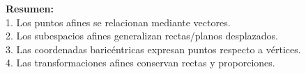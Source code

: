 \documentclass[preview]{standalone}
\begin{document}
\begin{center}
\textbf{Resumen:}\\1. Los puntos afines se relacionan mediante vectores.\\2. Los subespacios afines generalizan rectas/planos desplazados.\\3. Las coordenadas baricéntricas expresan puntos respecto a vértices.\\4. Las transformaciones afines conservan rectas y proporciones.
\end{center}
\end{document}
